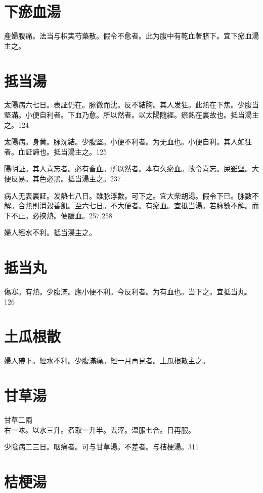\documentclass[b5paper,twoside,zihao=-4,UTF8]{ctexbook}
\begin{document}
\section{下瘀血湯}

產婦腹痛。法当与枳実芍藥散。假令不愈者。此为腹中有乾血著脐下。宜下瘀血湯主之。

\section{抵当湯}

太陽病六七日。表証仍在。脉微而沈。反不結胸。其人发狂。此熱在下焦。少腹当堅滿。小便自利者。下血乃愈。所以然者。以太陽隨經。瘀熱在裏故也。抵当湯主之。124

太陽病。身黄。脉沈結。少腹堅。小便不利者。为无血也。小便自利。其人如狂者。血証諦也。抵当湯主之。125

陽明証。其人喜忘者。必有畜血。所以然者。本有久瘀血。故令喜忘。屎雖堅。大便反易。其色必黑。抵当湯主之。237

病人无表裏証。发熱七八日。雖脉浮數。可下之。{宜大柴胡湯。}假令下已。脉數不解。合熱則消穀善飢。至六七日。不大便者。有瘀血。宜抵当湯。若脉數不解。而下不止。必挾熱。便膿血。257.258

婦人經水不利。抵当湯主之。

\section{抵当丸}

傷寒。有熱。少腹滿。應小便不利。今反利者。为有血也。当下之。宜抵当丸。126

\section{土瓜根散}

{婦人}帶下。經水不利。少腹滿痛。經一月再見者。土瓜根散主之。

\section{甘草湯}

甘草{\scriptsize 二兩}\\
右一味。以水三升。煮取一升半。去滓。温服七合。日再服。

少陰病二三日。咽痛者。可与甘草湯。不差者。与桔梗湯。311

\section{桔梗湯}
\end{document}
